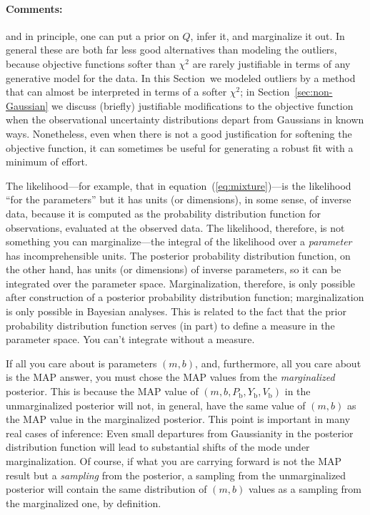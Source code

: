 \documentclass[12pt,twoside]{article}
\newcommand{\sectionname}{Section}
\newcommand{\commentsname}{Comments}
\newenvironment{comments}{\paragraph{\commentsname:}}{}
\newcommand{\Pbad}{P_{\mathrm{b}}}
\newcommand{\Ybad}{Y_{\mathrm{b}}}
\newcommand{\Vbad}{V_{\mathrm{b}}}
\begin{document}
\begin{comments}
and in principle, one can put a prior on $Q$, infer it, and
marginalize it out.  In general these are both far less good
alternatives than modeling the outliers, because objective functions
softer than $\chi^2$ are rarely justifiable in terms of any generative
model for the data.  In this \sectionname\ we modeled
outliers by a method that can almost be interpreted in terms of a
softer $\chi^2$; in \sectionname~\ref{sec:non-Gaussian} we discuss
(briefly) justifiable modifications to the objective function when the
observational uncertainty distributions depart from Gaussians in known
ways.  Nonetheless, even when there is not a good justification for
softening the objective function, it can sometimes be useful for
generating a robust fit with a minimum of effort.

The likelihood---for example, that in equation~(\ref{eq:mixture})---is
the likelihood ``for the parameters'' but it has units (or
dimensions), in some sense, of inverse data, because it is computed as
the probability distribution function for observations, evaluated at
the observed data.  The likelihood, therefore, is not something you
can marginalize---the integral of the likelihood over a
\emph{parameter} has incomprehensible units.  The posterior
probability distribution function, on the other hand, has units (or
dimensions) of inverse parameters, so it can be integrated over the
parameter space.  Marginalization, therefore, is only possible after
construction of a posterior probability distribution function;
marginalization is only possible in Bayesian analyses.  This is
related to the fact that the prior probability distribution function
serves (in part) to define a measure in the parameter space.  You
can't integrate without a measure.

If all you care about is parameters $(m,b)$, and, furthermore, all you
care about is the MAP answer, you must chose the MAP values from the
\emph{marginalized} posterior.  This is because the MAP value of
$(m,b,\Pbad,\Ybad,\Vbad)$ in the unmarginalized posterior will not, in
general, have the same value of $(m,b)$ as the MAP value in the
marginalized posterior.  This point is important in many real cases of
inference: Even small departures from Gaussianity in the posterior
distribution function will lead to substantial shifts of the mode
under marginalization.  Of course, if what you are carrying forward is
not the MAP result but a \emph{sampling} from the posterior, a
sampling from the unmarginalized posterior will contain the same
distribution of $(m,b)$ values as a sampling from the marginalized
one, by definition.


\end{comments}
\end{document}
